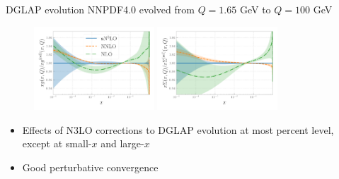 \documentclass[8pt,t]{beamer}
\begin{document}
\begin{frame}{DGLAP evolution}
  NNPDF4.0 evolved from $Q=1.65$ GeV to $Q=100$ GeV
  \begin{figure}[!t]
    \centering
    \includegraphics[width=0.4\textwidth]{figures/N3LOevolution-q100gev-ratios_expanded_0.pdf}
    \includegraphics[width=0.4\textwidth]{figures/N3LOevolution-q100gev-ratios_expanded_1.pdf}\\
  \end{figure}

  \begin{itemize}
    \item Effects of N3LO corrections to DGLAP evolution at most percent level, except at small-$x$ and large-$x$
    \item Good perturbative convergence
  \end{itemize}

\end{frame}
\end{document}
